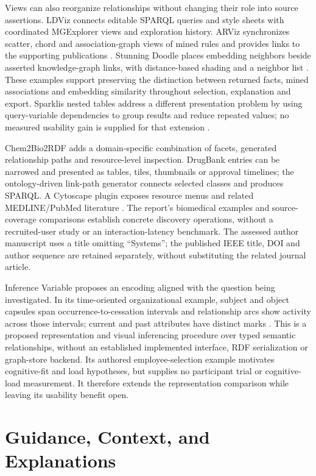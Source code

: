 \documentclass[manuscript,review,screen]{acmart}
\begin{document}
Views can also reorganize relationships without changing their role into source assertions. LDViz connects editable SPARQL queries and style sheets with coordinated MGExplorer views and exploration history. ARViz synchronizes scatter, chord and association-graph views of mined rules and provides links to the supporting publications \citep{V3-01178,V3-00411}. Stunning Doodle places embedding neighbors beside asserted knowledge-graph links, with distance-based shading and a neighbor list \citep{V3-02586}. These examples support preserving the distinction between returned facts, mined associations and embedding similarity throughout selection, explanation and export. Sparklis nested tables address a different presentation problem by using query-variable dependencies to group results and reduce repeated values; no measured usability gain is supplied for that extension \citep{V3-00261}.

Chem2Bio2RDF adds a domain-specific combination of facets, generated relationship paths and resource-level inspection. DrugBank entries can be narrowed and presented as tables, tiles, thumbnails or approval timelines; the ontology-driven link-path generator connects selected classes and produces SPARQL. A Cytoscape plugin exposes resource menus and related MEDLINE/PubMed literature \citep{V3-00576}. The report's biomedical examples and source-coverage comparisons establish concrete discovery operations, without a recruited-user study or an interaction-latency benchmark. The assessed author manuscript uses a title omitting ``Systems''; the published IEEE title, DOI and author sequence are retained separately, without substituting the related journal article.

Inference Variable proposes an encoding aligned with the question being investigated. In its time-oriented organizational example, subject and object capsules span occurrence-to-cessation intervals and relationship arcs show activity across those intervals; current and past attributes have distinct marks \citep{V3-01484}. This is a proposed representation and visual inferencing procedure over typed semantic relationships, without an established implemented interface, RDF serialization or graph-store backend. Its authored employee-selection example motivates cognitive-fit and load hypotheses, but supplies no participant trial or cognitive-load measurement. It therefore extends the representation comparison while leaving its usability benefit open.

\section{Guidance, Context, and Explanations}
\end{document}
